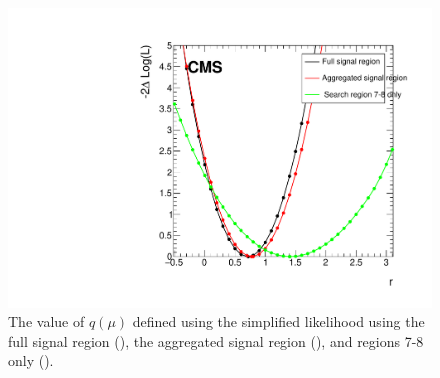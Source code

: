 \begin{figure}[hbt]
  \begin{center} 
   \includegraphics[width=1.5\cmsFigWidth]{figures/r_agg.pdf}
   \caption{The value of $q(\mu)$ defined using the simplified likelihood using the full signal region (), the aggregated signal region (),
   and regions 7-8 only ().}
   \label{fig:agg-likelihoodscan} 
  \end{center}
\end{figure}

